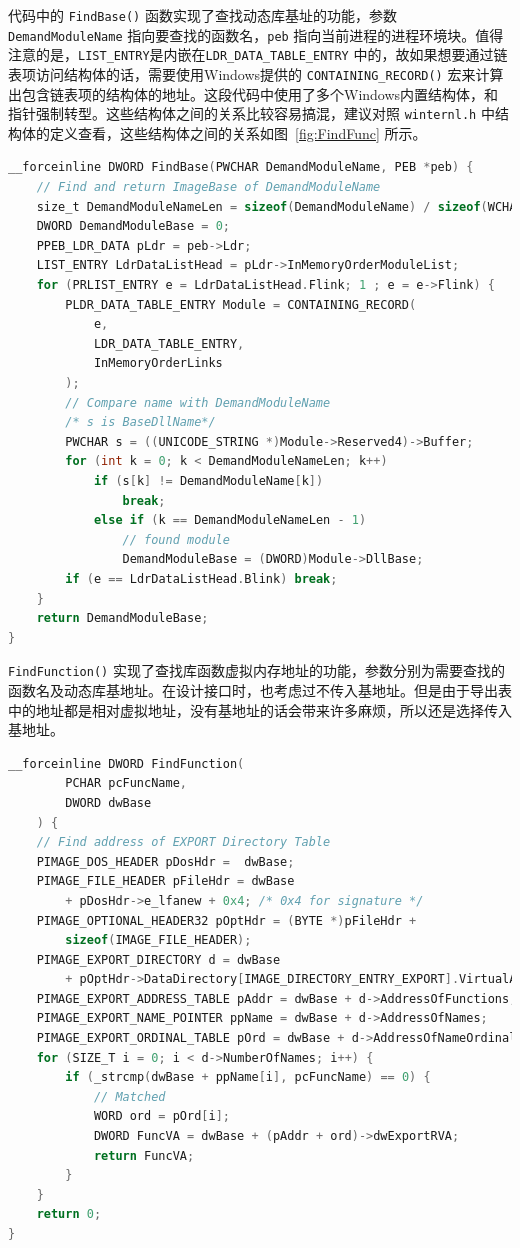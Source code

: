 \documentclass[UTF8]{ctexart}
\begin{document}
    代码中的 \lstinline{FindBase()} 函数实现了查找动态库基址的功能，参数 \lstinline{DemandModuleName} 指向要查找的函数名，\lstinline{peb} 指向当前进程的进程环境块。值得注意的是，\lstinline{LIST_ENTRY}是内嵌在\lstinline{LDR_DATA_TABLE_ENTRY} 中的，故如果想要通过链表项访问结构体的话，需要使用Windows提供的 \lstinline{CONTAINING_RECORD()} 宏来计算出包含链表项的结构体的地址。这段代码中使用了多个Windows内置结构体，和指针强制转型。这些结构体之间的关系比较容易搞混，建议对照 \lstinline{winternl.h} 中结构体的定义查看，这些结构体之间的关系如图~\ref{fig:FindFunc} 所示。

    \begin{lstlisting}[language=C,caption={查找动态库基址},label={FindBase},captionpos=b]
__forceinline DWORD FindBase(PWCHAR DemandModuleName, PEB *peb) {
    // Find and return ImageBase of DemandModuleName
    size_t DemandModuleNameLen = sizeof(DemandModuleName) / sizeof(WCHAR);  
    DWORD DemandModuleBase = 0;
    PPEB_LDR_DATA pLdr = peb->Ldr;
    LIST_ENTRY LdrDataListHead = pLdr->InMemoryOrderModuleList;
    for (PRLIST_ENTRY e = LdrDataListHead.Flink; 1 ; e = e->Flink) {
        PLDR_DATA_TABLE_ENTRY Module = CONTAINING_RECORD(
            e,
            LDR_DATA_TABLE_ENTRY,
            InMemoryOrderLinks
        );
        // Compare name with DemandModuleName
        /* s is BaseDllName*/
        PWCHAR s = ((UNICODE_STRING *)Module->Reserved4)->Buffer;
        for (int k = 0; k < DemandModuleNameLen; k++)
            if (s[k] != DemandModuleName[k])
                break;
            else if (k == DemandModuleNameLen - 1)
                // found module
                DemandModuleBase = (DWORD)Module->DllBase;
        if (e == LdrDataListHead.Blink) break;
    }
    return DemandModuleBase;
}
    \end{lstlisting}
    
    \lstinline{FindFunction()} 实现了查找库函数虚拟内存地址的功能，参数分别为需要查找的函数名及动态库基地址。在设计接口时，也考虑过不传入基地址。但是由于导出表中的地址都是相对虚拟地址，没有基地址的话会带来许多麻烦，所以还是选择传入基地址。
    
    \begin{lstlisting}[language=C,caption={查找库函数地址},captionpos=b,label={FundFunction}]
__forceinline DWORD FindFunction(
        PCHAR pcFuncName,
        DWORD dwBase
    ) {
    // Find address of EXPORT Directory Table
    PIMAGE_DOS_HEADER pDosHdr =  dwBase;
    PIMAGE_FILE_HEADER pFileHdr = dwBase
        + pDosHdr->e_lfanew + 0x4; /* 0x4 for signature */
    PIMAGE_OPTIONAL_HEADER32 pOptHdr = (BYTE *)pFileHdr + 
    	sizeof(IMAGE_FILE_HEADER);
    PIMAGE_EXPORT_DIRECTORY d = dwBase
        + pOptHdr->DataDirectory[IMAGE_DIRECTORY_ENTRY_EXPORT].VirtualAddress;
    PIMAGE_EXPORT_ADDRESS_TABLE pAddr = dwBase + d->AddressOfFunctions;
    PIMAGE_EXPORT_NAME_POINTER ppName = dwBase + d->AddressOfNames;
    PIMAGE_EXPORT_ORDINAL_TABLE pOrd = dwBase + d->AddressOfNameOrdinals;
    for (SIZE_T i = 0; i < d->NumberOfNames; i++) {
        if (_strcmp(dwBase + ppName[i], pcFuncName) == 0) {
            // Matched
            WORD ord = pOrd[i];
            DWORD FuncVA = dwBase + (pAddr + ord)->dwExportRVA;
            return FuncVA;
        }
    }
    return 0;
}
    \end{lstlisting}
\end{document}
